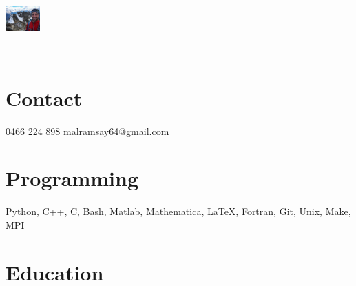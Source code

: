 \documentclass[]{friggeri-cv} %
\begin{document}


\begin{aside} %
    \vspace{30 mm}~
\begin{flushleft}\includegraphics[width=3.6em]{portrait}\\\end{flushleft}~
\section{Contact}
0466 224 898
\href{mailto:malramsay64@gmail.com}{malramsay64@gmail.com}
\section{Programming}
Python, C++, C, Bash,
Matlab, Mathematica,
\LaTeX, Fortran, Git,
Unix, Make, MPI
\end{aside}


\section{Education}
\end{document}
